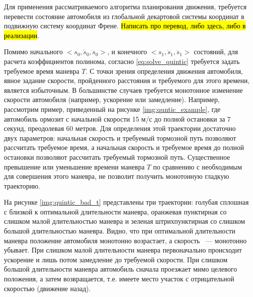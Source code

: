 Для применения рассматриваемого алгоритма планирования движения, требуется перевести состояние автомобиля из
глобальной декартовой системы координат в подвижную систему координат Френе. \hl{Написать про перевод, либо здесь,
либо в реализации}.

Помимо начального $<s_0, \dot{s}_0, \ddot{s}_0>$, и конечного $<s_1, \dot{s}_1, \ddot{s}_1>$ состояний, для расчета
коэффициентов полинома, согласно \ref{eq:solve_quintic} требуется задать требуемое время маневра $T$. С точки зрения
определения движения автомобиля, явное задание скорости, пройденного расстояния и требуемого для этого времени, является
избыточным. В большинстве случаев требуется монотонное изменение скорости автомобиля (например, ускорение или
замедление). Например, рассмотрим пример, приведенный на рисунке \ref{img:quntic_example}, где автомобиль
ормозит с начальной скорости 15 м/с до полной остановки за 7 секунд, преодолевая 60 метров. Для определения этой траектории
достаточно двух параметров: начальная скорость и требуемый тормозной путь позволяют рассчитать требуемое время, а
начальная скорость и требуемое время до полной остановки позволяют рассчитать требуемый тормозной путь. Существенное
превышение или уменьшение времени маневра $T$ по сравнению с необходимым для совершения этого маневра, не позволит
получить монотонную гладкую траекторию.

На рисунке \ref{img:quintic_bad_t} представлены три траектории:
голубая сплошная с близкой к оптимальной длительности маневра, оранжевая пунктирная со слишком малой длительностью
маневра и зеленая штрихпунктирная со слишком большой длительностью маневра.
Видно, что при оптимальной длительности маневра положение автомобиля монотонно
возрастает, а скорость ~--- монотонно убывает. При слишком малой длительности маневра первоначально происходит
ускорение и лишь потом замедление до требуемой скорости. При слишком большой длительности маневра автомобиль сначала
проезжает мимо целевого положения, а затем возвращается, т.е. имеете место участок с отрицательной скоростью
(движение назад).

